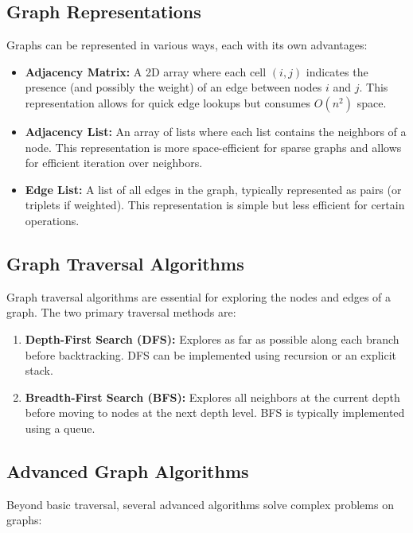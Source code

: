 \subsection*{Graph Representations}
Graphs can be represented in various ways, each with its own advantages:

\begin{itemize}
    \item \textbf{Adjacency Matrix:} A 2D array where each cell \((i, j)\) indicates the presence (and possibly the weight) of an edge between nodes \(i\) and \(j\). This representation allows for quick edge lookups but consumes \(O(n^2)\) space.
    
    \item \textbf{Adjacency List:} An array of lists where each list contains the neighbors of a node. This representation is more space-efficient for sparse graphs and allows for efficient iteration over neighbors.
    
    \item \textbf{Edge List:} A list of all edges in the graph, typically represented as pairs (or triplets if weighted). This representation is simple but less efficient for certain operations.
\end{itemize}

\subsection*{Graph Traversal Algorithms}
Graph traversal algorithms are essential for exploring the nodes and edges of a graph. The two primary traversal methods are:

\begin{enumerate}
    \item \textbf{Depth-First Search (DFS):} Explores as far as possible along each branch before backtracking. DFS can be implemented using recursion or an explicit stack.
    
    \item \textbf{Breadth-First Search (BFS):} Explores all neighbors at the current depth before moving to nodes at the next depth level. BFS is typically implemented using a queue.
\end{enumerate}

\subsection*{Advanced Graph Algorithms}
Beyond basic traversal, several advanced algorithms solve complex problems on graphs:

